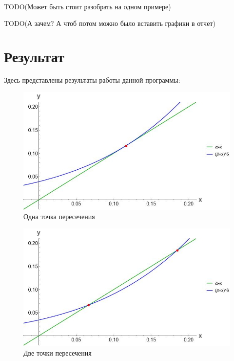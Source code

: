 \documentclass[14pt]{extarticle}
\begin{document}
        TODO(Может быть стоит разобрать на одном примере)

        TODO(А зачем? А чтоб потом можно было вставить графики в отчет)

    \section*{Результат}

        Здесь представлены результаты работы данной программы:

        \begin{figure}[h]
            \centering
            \includegraphics[width=\textwidth]{images/one_intersection.jpg}
            \caption{Одна точка пересечения}
        \end{figure}

        \begin{figure}[h]
            \centering
            \includegraphics[width=\textwidth]{images/two_intersection.jpg}
            \caption{Две точки пересечения}
        \end{figure}
\end{document}
